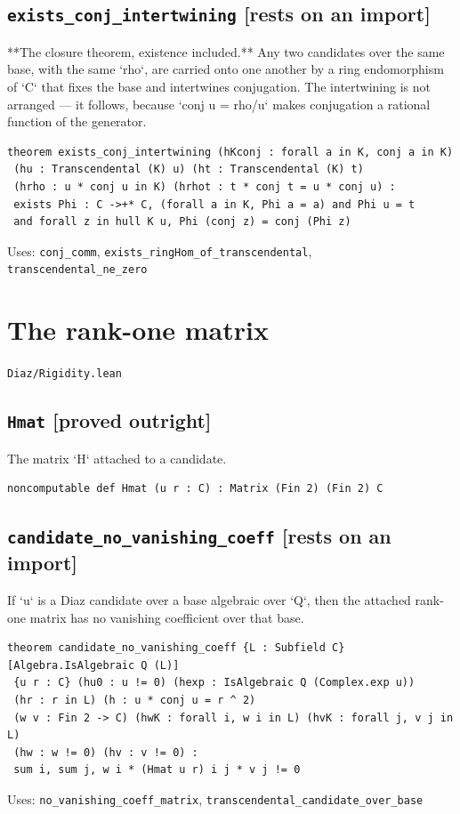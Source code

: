 \documentclass[11pt,a4paper]{article}
\newcommand{\tagon}{\textcolor{onaxc}{\textbf{[rests on an import]}}}
\newcommand{\tagpr}{\textcolor{provedc}{\textbf{[proved outright]}}}
\begin{document}
\subsection*{\texttt{exists\_conj\_intertwining} \hfill \tagon}

**The closure theorem, existence included.** Any two candidates over the same base, with the same `rho`, are carried onto one another by a ring endomorphism of `C` that fixes the base and intertwines conjugation. The intertwining is not arranged --- it follows, because `conj u = rho/u` makes conjugation a rational function of the generator.

\begin{lstlisting}
theorem exists_conj_intertwining (hKconj : forall a in K, conj a in K)
 (hu : Transcendental (K) u) (ht : Transcendental (K) t)
 (hrho : u * conj u in K) (hrhot : t * conj t = u * conj u) :
 exists Phi : C ->+* C, (forall a in K, Phi a = a) and Phi u = t
 and forall z in hull K u, Phi (conj z) = conj (Phi z)
\end{lstlisting}
\noindent\footnotesize Uses: \texttt{conj\_comm}, \texttt{exists\_ringHom\_of\_transcendental}, \texttt{transcendental\_ne\_zero}\normalsize


\section{The rank-one matrix}
\noindent\texttt{Diaz/Rigidity.lean}


\subsection*{\texttt{Hmat} \hfill \tagpr}

The matrix `H` attached to a candidate.

\begin{lstlisting}
noncomputable def Hmat (u r : C) : Matrix (Fin 2) (Fin 2) C
\end{lstlisting}

\subsection*{\texttt{candidate\_no\_vanishing\_coeff} \hfill \tagon}

If `u` is a Diaz candidate over a base algebraic over `Q`, then the attached rank-one matrix has no vanishing coefficient over that base.

\begin{lstlisting}
theorem candidate_no_vanishing_coeff {L : Subfield C} [Algebra.IsAlgebraic Q (L)]
 {u r : C} (hu0 : u != 0) (hexp : IsAlgebraic Q (Complex.exp u))
 (hr : r in L) (h : u * conj u = r ^ 2)
 (w v : Fin 2 -> C) (hwK : forall i, w i in L) (hvK : forall j, v j in L)
 (hw : w != 0) (hv : v != 0) :
 sum i, sum j, w i * (Hmat u r) i j * v j != 0
\end{lstlisting}
\noindent\footnotesize Uses: \texttt{no\_vanishing\_coeff\_matrix}, \texttt{transcendental\_candidate\_over\_base}\normalsize
\end{document}
